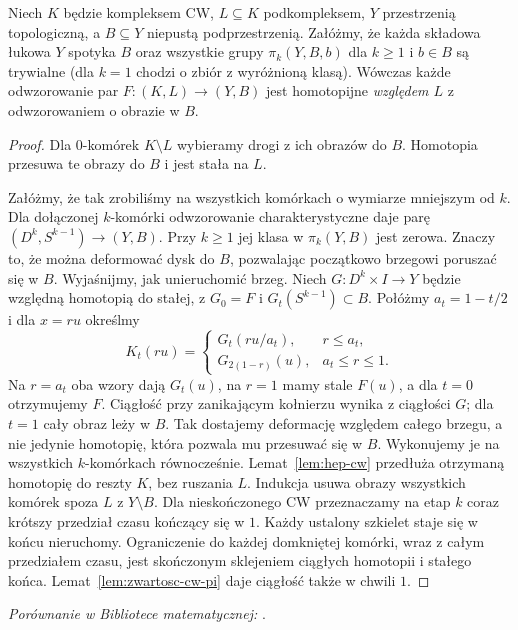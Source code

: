 \begin{lemat}
\label{lem:kompresja-cw}
Niech $K$ będzie kompleksem CW, $L\subseteq K$
podkompleksem, $Y$ przestrzenią topologiczną,
a $B\subseteq Y$ niepustą podprzestrzenią. Załóżmy, że
każda składowa łukowa $Y$ spotyka
$B$ oraz wszystkie grupy
$\pi_k(Y,B,b)$ dla
$k\geq1$ i $b\in B$
są trywialne (dla $k=1$ chodzi o zbiór z wyróżnioną klasą). Wówczas
każde odwzorowanie par
$F:(K,L)\to(Y,B)$
jest homotopijne
\emph{względem $L$}
z odwzorowaniem o obrazie w $B$.
\end{lemat}
\begin{proof}
Dla $0$-komórek $K\setminus L$
wybieramy drogi z ich obrazów
do $B$. Homotopia przesuwa
te obrazy do $B$ i jest
stała na $L$.

Załóżmy, że tak zrobiliśmy
na wszystkich komórkach
o wymiarze mniejszym od $k$.
Dla dołączonej $k$-komórki
odwzorowanie charakterystyczne
daje parę
$(D^k,S^{k-1})\to(Y,B)$.
Przy $k\geq1$ jej klasa
w $\pi_k(Y,B)$ jest zerowa.
Znaczy to, że można
deformować dysk do $B$,
pozwalając początkowo
brzegowi poruszać się w $B$.
Wyjaśnijmy, jak unieruchomić brzeg. Niech
$G:D^k\times I\to Y$ będzie względną homotopią do stałej,
z $G_0=F$ i $G_t(S^{k-1})\subset B$.
Połóżmy $a_t=1-t/2$ i dla $x=ru$ określmy
\[
 K_t(ru)=
 \begin{cases}
 G_t(ru/a_t),&r\leq a_t,\\
 G_{2(1-r)}(u),&a_t\leq r\leq1.
 \end{cases}
\]
Na $r=a_t$ oba wzory dają $G_t(u)$, na $r=1$ mamy stale $F(u)$,
a dla $t=0$ otrzymujemy $F$. Ciągłość przy zanikającym kołnierzu
wynika z ciągłości $G$; dla $t=1$ cały obraz leży w $B$.
Tak dostajemy deformację względem całego brzegu, a nie jedynie
homotopię, która pozwala mu przesuwać się w $B$.
Wykonujemy je na
wszystkich $k$-komórkach
równocześnie.
Lemat~\ref{lem:hep-cw}
przedłuża otrzymaną
homotopię do reszty
$K$, bez ruszania $L$.
Indukcja usuwa obrazy
wszystkich komórek
spoza $L$ z $Y\setminus B$.
Dla nieskończonego CW
przeznaczamy na etap $k$
coraz krótszy przedział
czasu kończący się w $1$.
Każdy ustalony szkielet staje się w końcu nieruchomy.
Ograniczenie do każdej domkniętej komórki, wraz z całym przedziałem czasu,
jest skończonym sklejeniem ciągłych homotopii i stałego końca.
Lemat~\ref{lem:zwartosc-cw-pi} daje ciągłość także w chwili $1$.
\end{proof}

\noindent\emph{Porównanie w Bibliotece matematycznej:} .

